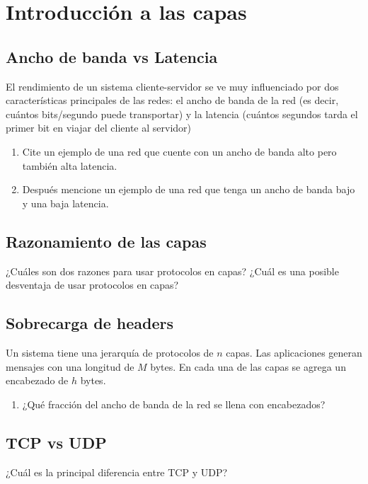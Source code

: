 \documentclass[12pt]{report}
\begin{document}
%
%


\chapter{Introducción a las capas}

\section{Ancho de banda vs Latencia \stwo \steo}
El rendimiento de un sistema cliente-servidor se ve muy influenciado por dos características principales de las redes: el ancho de banda de la red (es decir, cuántos bits/segundo puede transportar) y la latencia (cuántos segundos tarda el primer bit en viajar del cliente al servidor)

\begin{enumerate}
\item Cite un ejemplo de una red que cuente con un ancho de banda alto pero también alta latencia.
\item Después mencione un ejemplo de una red que tenga un ancho de banda bajo y una baja latencia.
\end{enumerate}

\section{Razonamiento de las capas \stwo \steo}
¿Cuáles son dos razones para usar protocolos en capas? ¿Cuál es una posible desventaja de usar protocolos en capas?

\section{Sobrecarga de headers \sthree}
Un sistema tiene una jerarquía de protocolos de $n$ capas. Las aplicaciones generan mensajes con una longitud de $M$ bytes. En cada una de las capas se agrega un encabezado de $h$ bytes.

\begin{enumerate}
\item ¿Qué fracción del ancho de banda de la red se llena con encabezados?
\end{enumerate}

\section{TCP vs UDP \sone \steo}
¿Cuál es la principal diferencia entre TCP y UDP?
\end{document}
